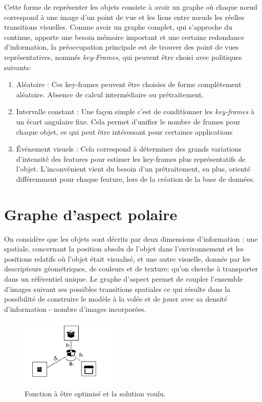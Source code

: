 Cette forme de représenter les objets consiste à avoir un graphe où
chaque nœud correspond à une image d'un point de vue et les liens
entre nœuds les réelles transitions visuelles. Comme avoir un graphe
complet, qui s'approche du continue, apporte une besoin mémoire
important et une certaine redondance d'information, la préoccupation
principale est de trouver des point de vues représentatives, nommés
\textit{key-Frames}, qui peuvent être choisi avec politiques suivants:
\begin{enumerate}
\item Aléatoire : Ces key-frames peuvent être choisies de forme
complètement aléatoire. Absence de calcul intermédiaire ou
prétraitement.

\item Intervalle constant : Une façon simple c'est de conditionner les
\textit{key-frames} à un écart angulaire fixe. Cela permet d'unifier
le nombre de frames pour chaque objet, ce qui peut être intéressant
pour certaines applications

\item Événement visuels : Cela correspond à déterminer des grands
variations d'intensité des features pour estimer les key-frames plus
représentatifs de l'objet. L'inconvénient vient du besoin d'un
prétraitement, en plus, orienté différemment pour chaque feature,
lors de la création de la base de données.

\end{enumerate}

\section {Graphe d'aspect polaire}

On considère que les objets sont décrits par deux dimensions
d'information : une spatiale, concernant la position absolu de l'objet
dans l'environnement et les positions relatifs où l'objet était
visualisé, et une autre visuelle, donnée par les descripteurs
géométriques, de couleurs et de texture; qu'on cherche à transporter
dans un référentiel unique. Le graphe d'aspect permet de coupler
l'ensemble d'images suivant ses possibles transitions spatiales ce qui
résulte dans la possibilité de construire le modèle à la volée et de
jouer avec sa densité d'information - nombre d'images incorporées.

\begin{figure}[H]
\centering
\includegraphics[width=0.4\textwidth]{object_model.png}
\caption{Fonction \`{a} \^{e}tre optimis\'{e} et la solution voulu.}
\end{figure}

